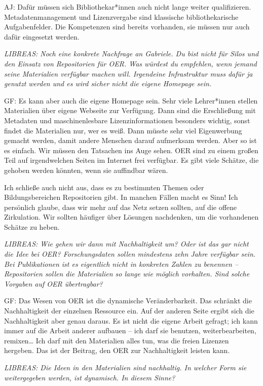 \documentclass[a4paper,
fontsize=11pt,
oneside,
numbers=noperiodatend,
parskip=half-,
bibliography=totoc,
final
]{scrartcl}
\begin{document}
AJ: Dafür müssen sich Bibliothekar*innen auch nicht lange weiter
qualifizieren. Metadatenmanagement und Lizenzvergabe sind klassische
bibliothekarische Aufgabenfelder. Die Kompetenzen sind bereits
vorhanden, sie müssen nur auch dafür eingesetzt werden.

\emph{LIBREAS: Noch eine konkrete Nachfrage an Gabriele. Du bist nicht
für Silos und den Einsatz von Repositorien für OER. Was würdest du
empfehlen, wenn jemand seine Materialien verfügbar machen will.
Irgendeine Infrastruktur muss dafür ja genutzt werden und es wird sicher
nicht die eigene Homepage sein.}

GF: Es kann aber auch die eigene Homepage sein. Sehr viele Lehrer*innen
stellen Materialien über eigene Webseite zur Verfügung. Dann sind die
Erschließung mit Metadaten und maschinenlesbare Lizenzinformationen
besonders wichtig, sonst findet die Materialien nur, wer es weiß. Dann
müsste sehr viel Eigenwerbung gemacht werden, damit andere Menschen
darauf aufmerksam werden. Aber so ist es einfach. Wir müssen den
Tatsachen ins Auge sehen. OER sind zu einem großen Teil auf
irgendwelchen Seiten im Internet frei verfügbar. Es gibt viele Schätze,
die gehoben werden könnten, wenn sie auffindbar wären.

Ich schließe auch nicht aus, dass es zu bestimmten Themen oder
Bildungsbereichen Repositorien gibt. In manchen Fällen macht es Sinn!
Ich persönlich glaube, dass wir mehr auf das Netz setzen sollten, auf
die offene Zirkulation. Wir sollten häufiger über Lösungen nachdenken,
um die vorhandenen Schätze zu heben.

\emph{LIBREAS: Wie gehen wir dann mit Nachhaltigkeit um? Oder ist das
gar nicht die Idee bei OER? Forschungsdaten sollen mindestens zehn Jahre
verfügbar sein. Bei Publikationen ist es eigentlich nicht in konkreten
Zahlen zu benennen -- Repositorien sollen die Materialien so lange wie
möglich vorhalten. Sind solche Vorgaben auf OER übertragbar?}

GF: Das Wesen von OER ist die dynamische Veränderbarkeit. Das schränkt
die Nachhaltigkeit der einzelnen Ressource ein. Auf der anderen Seite
ergibt sich die Nachhaltigkeit aber genau daraus. Es ist nicht die
eigene Arbeit gefragt; ich kann immer auf die Arbeit anderer aufbauen --
ich darf sie benutzen, weiterbearbeiten, remixen\ldots{} Ich darf mit
den Materialien alles tun, was die freien Lizenzen hergeben. Das ist der
Beitrag, den OER zur Nachhaltigkeit leisten kann.

\emph{LIBREAS: Die Ideen in den Materialien sind nachhaltig. In welcher
Form sie weitergegeben werden, ist dynamisch. In diesem Sinne?}
\end{document}
